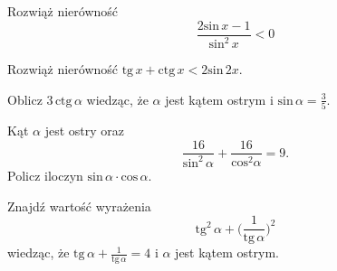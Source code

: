 \zadanie Rozwiąż nierówność \[ \dfrac{2\text{sin}\, x - 1}{\text{sin}^2\, x} < 0 \]

\zadanie Rozwiąż nierówność $ \text{tg}\,x + \text{ctg}\,x < 2\text{sin}\,2x$.

\zadanie Oblicz $ 3\,\text{ctg}\,\alpha $ wiedząc, że $\alpha$ jest kątem ostrym i $\text{sin}\,\alpha = \frac{3}{5} $.

\zadanie Kąt $\alpha$ jest ostry oraz \[ \dfrac{16}{\text{sin}^2\, \alpha} + \dfrac{16}{\text{cos}^2 \alpha} = 9. \] Policz iloczyn $\text{sin}\, \alpha\cdot\text{cos}\, \alpha$.

\zadanie Znajdź wartość wyrażenia \[\text{tg}^2\,\alpha + \bigg(\frac{1}{\text{tg}\,\alpha}\bigg)^2 \] wiedząc, że $\text{tg}\,\alpha + \frac{1}{\text{tg}\,\alpha} = 4$ i $\alpha$ jest kątem ostrym.
